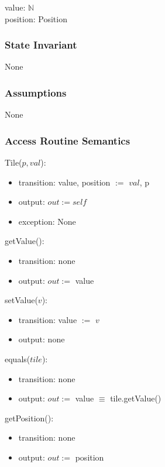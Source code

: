\documentclass[12pt]{article}
\begin{document}
value: $\mathbb{N}$\\
position: Position\\

\subsubsection* {State Invariant}

None

\subsubsection* {Assumptions}

None

\subsubsection* {Access Routine Semantics}

\noindent Tile($p, val$):
\begin{itemize}
\item transition: value, position $:=$ $val$, p
\item output: $out := \mathit{self}$
\item exception: None
\end{itemize}

\noindent getValue():
\begin{itemize}
\item transition: none
\item output: $out := $ value
\end{itemize}

\noindent setValue($v$):
\begin{itemize}
\item transition: value $:=$ $v$
\item output: none
\end{itemize}

\noindent equals($tile$):
\begin{itemize}
\item transition: none
\item output: $out := $ value $\equiv$ tile.getValue()
\end{itemize}

\noindent getPosition():
\begin{itemize}
\item transition: none
\item output: $out := $ position
\end{itemize}
\end{document}

